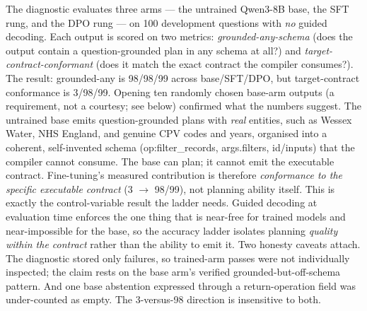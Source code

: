 The diagnostic evaluates three arms --- the untrained Qwen3-8B base, the SFT rung, and the DPO rung --- on 100 development questions with \emph{no} guided decoding. Each output is scored on two metrics: \emph{grounded-any-schema} (does the output contain a question-grounded plan in any schema at all?) and \emph{target-contract-conformant} (does it match the exact contract the compiler consumes?). The result: grounded-any is 98/98/99 across base/SFT/DPO, but target-contract conformance is 3/98/99. Opening ten randomly chosen base-arm outputs (a requirement, not a courtesy; see below) confirmed what the numbers suggest. The untrained base emits question-grounded plans with \emph{real} entities, such as Wessex Water, NHS England, and genuine CPV codes and years, organised into a coherent, self-invented schema (op:filter\_records, args.filters, id/inputs) that the compiler cannot consume. The base can plan; it cannot emit the executable contract. Fine-tuning's measured contribution is therefore \emph{conformance to the specific executable contract} (3 $\rightarrow$ 98/99), not planning ability itself. This is exactly the control-variable result the ladder needs. Guided decoding at evaluation time enforces the one thing that is near-free for trained models and near-impossible for the base, so the accuracy ladder isolates planning \emph{quality within the contract} rather than the ability to emit it. Two honesty caveats attach. The diagnostic stored only failures, so trained-arm passes were not individually inspected; the claim rests on the base arm's verified grounded-but-off-schema pattern. And one base abstention expressed through a return-operation field was under-counted as empty. The 3-versus-98 direction is insensitive to both.


